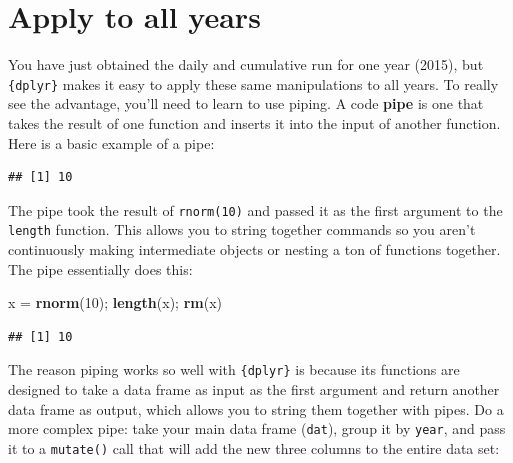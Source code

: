 \documentclass[]{book}
\newenvironment{Shaded}{\begin{snugshade}}{\end{snugshade}}
\newcommand{\KeywordTok}[1]{\textcolor[rgb]{0.13,0.29,0.53}{\textbf{#1}}}
\newcommand{\DecValTok}[1]{\textcolor[rgb]{0.00,0.00,0.81}{#1}}
\newcommand{\StringTok}[1]{\textcolor[rgb]{0.31,0.60,0.02}{#1}}
\newcommand{\OperatorTok}[1]{\textcolor[rgb]{0.81,0.36,0.00}{\textbf{#1}}}
\newcommand{\NormalTok}[1]{#1}
\theoremstyle{definition}
\theoremstyle{definition}
\theoremstyle{definition}
\theoremstyle{remark}
\begin{document}
\section{Apply to all years}\label{apply-to-all-years}

You have just obtained the daily and cumulative run for one year (2015),
but \texttt{\{dplyr\}} makes it easy to apply these same manipulations
to all years. To really see the advantage, you'll need to learn to use
piping. A code \textbf{pipe} is one that takes the result of one
function and inserts it into the input of another function. Here is a
basic example of a pipe:

\begin{Shaded}
\end{Shaded}

\begin{verbatim}
## [1] 10
\end{verbatim}

The pipe took the result of \texttt{rnorm(10)} and passed it as the
first argument to the \texttt{length} function. This allows you to
string together commands so you aren't continuously making intermediate
objects or nesting a ton of functions together. The pipe essentially
does this:

\begin{Shaded}
\begin{Highlighting}[]
\NormalTok{x =}\StringTok{ }\KeywordTok{rnorm}\NormalTok{(}\DecValTok{10}\NormalTok{); }\KeywordTok{length}\NormalTok{(x); }\KeywordTok{rm}\NormalTok{(x)}
\end{Highlighting}
\end{Shaded}

\begin{verbatim}
## [1] 10
\end{verbatim}

The reason piping works so well with \texttt{\{dplyr\}} is because its
functions are designed to take a data frame as input as the first
argument and return another data frame as output, which allows you to
string them together with pipes. Do a more complex pipe: take your main
data frame (\texttt{dat}), group it by \texttt{year}, and pass it to a
\texttt{mutate()} call that will add the new three columns to the entire
data set:
\end{document}
